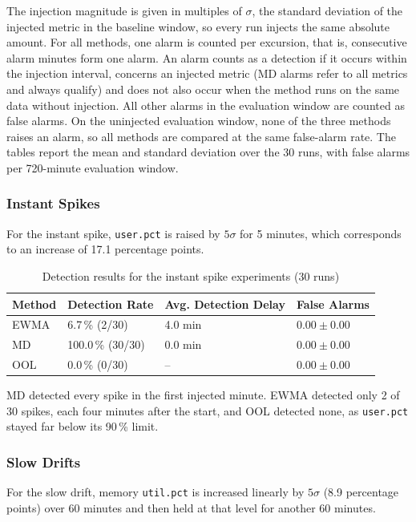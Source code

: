 The injection magnitude is given in multiples of $\sigma$, the standard deviation of the injected metric in the baseline window, so every run injects the same absolute amount. For all methods, one alarm is counted per excursion, that is, consecutive alarm minutes form one alarm. An alarm counts as a detection if it occurs within the injection interval, concerns an injected metric (MD alarms refer to all metrics and always qualify) and does not also occur when the method runs on the same data without injection. All other alarms in the evaluation window are counted as false alarms. On the uninjected evaluation window, none of the three methods raises an alarm, so all methods are compared at the same false-alarm rate. The tables report the mean and standard deviation over the 30 runs, with false alarms per 720-minute evaluation window.

\subsubsection{Instant Spikes}
For the instant spike, \texttt{user.pct} is raised by $5\sigma$ for 5 minutes, which corresponds to an increase of 17.1 percentage points.

\begin{table}[H]
\centering
\begin{tabularx}{\textwidth}{p{3.5cm}XXX}
\toprule
\textbf{Method} & \textbf{Detection Rate} & \textbf{Avg. Detection Delay} & \textbf{False Alarms} \\
\midrule
EWMA & 6.7\,\% (2/30)    & 4.0 min & $0.00 \pm 0.00$ \\
MD   & 100.0\,\% (30/30) & 0.0 min & $0.00 \pm 0.00$ \\
OOL  & 0.0\,\% (0/30)    & --      & $0.00 \pm 0.00$ \\
\bottomrule
\end{tabularx}
\caption{Detection results for the instant spike experiments (30 runs)}
\label{tab:instant_spike_results}
\end{table}

MD detected every spike in the first injected minute. EWMA detected only 2 of 30 spikes, each four minutes after the start, and OOL detected none, as \texttt{user.pct} stayed far below its 90\,\% limit.

\subsubsection{Slow Drifts}
For the slow drift, memory \texttt{util.pct} is increased linearly by $5\sigma$ (8.9 percentage points) over 60 minutes and then held at that level for another 60 minutes.

